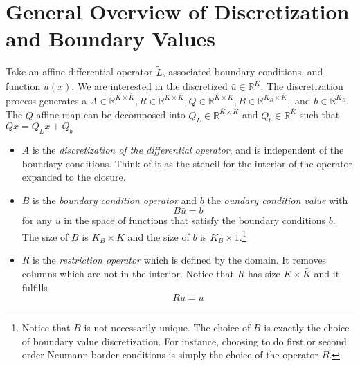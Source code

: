 \documentclass[11pt]{article}
\newcommand{\R}{\ensuremath{\mathbb{R}}}
\begin{document}
	\section{General Overview of Discretization and Boundary Values}\label{sec:general}
	Take an affine differential operator $\tilde{L}$, associated boundary conditions, and function $\tilde{u}(x)$.  We are interested in the discretized $\bar{u}\in \R^{\bar{K}}$.  The discretization process generates a $A \in \R^{K\times\bar{K}}, R \in \R^{K\times \bar{K}}, Q \in \R^{\bar{K}\times K}, B \in \R^{K_B \times \bar{K}},$ and $b \in \R^{K_B}$.  The $Q$ affine map can be decomposed into $Q_L \in \R^{\bar{K}\times K}$ and $Q_b \in \R^{\bar{K}}$ such that $Q x = Q_L x + Q_b$
	\begin{itemize}
		\item $A$ is the \textit{discretization of the differential operator}, and is independent of the boundary conditions.  Think of it as the stencil for the interior of the operator expanded to the closure.
		\item $B$ is the \textit{boundary condition operator} and $b$ the \textit{oundary condition value} with
		\begin{equation}
		B \bar{u} = b
		\label{B_operator_block}
		\end{equation}
		for any $\bar{u}$ in the space of functions that satisfy the boundary conditions $b$. The size of $B$ is $K_{B} \times \bar{K}$ and the size of $b$ is $K_{B} \times 1$.\footnote{
Notice that $B$ is not necessarily unique. The choice of $B$ is exactly the choice of boundary value discretization. For instance, choosing to do first or second order Neumann border conditions is simply the choice of the operator $B$.}
		\item $R$ is the \textit{restriction operator} which is defined by the domain. It removes columns which are not in the interior. Notice that $R$ has size $K \times \bar{K}$ and it fulfills
		\begin{equation}
		R \bar{u} = u \label{R_operator}
		\end{equation}


\end{itemize}
\end{document}
